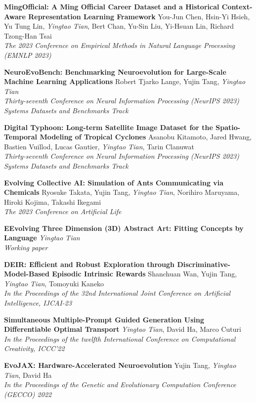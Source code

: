 \documentclass[line,margin]{cv}
\begin{document}
\begin{resume}
  {\bf MingOfficial: A Ming Official Career Dataset and a Historical Context-Aware Representation Learning Framework}
  You-Jun Chen, Hsin-Yi Hsieh, Yu Tung Lin, \emph{Yingtao Tian}, Bert Chan, Yu-Sin Liu, Yi-Hsuan Lin, Richard Tzong-Han Tsai\\
  \emph{The 2023 Conference on Empirical Methods in Natural Language Processing (EMNLP 2023)}

  {\bf NeuroEvoBench: Benchmarking Neuroevolution for Large-Scale Machine Learning Applications}
  Robert Tjarko Lange, Yujin Tang, \emph{Yingtao Tian}\\
  \emph{Thirty-seventh Conference on Neural Information Processing (NeurIPS 2023) Systems Datasets and Benchmarks Track}

  {\bf Digital Typhoon: Long-term Satellite Image Dataset for the Spatio-Temporal Modeling of Tropical Cyclones}
  Asanobu Kitamoto, Jared Hwang, Bastien Vuillod, Lucas Gautier, \emph{Yingtao Tian}, Tarin Clanuwat\\
  \emph{Thirty-seventh Conference on Neural Information Processing (NeurIPS 2023) Systems Datasets and Benchmarks Track}

  {\bf Evolving Collective AI: Simulation of Ants Communicating via Chemicals}
  Ryosuke Takata, Yujin Tang, \emph{Yingtao Tian}, Norihiro Maruyama, Hiroki Kojima, Takashi Ikegami\\
  \emph{The 2023 Conference on Artificial Life}

  {\bf EEvolving Three Dimension (3D) Abstract Art: Fitting Concepts by Language}
  \emph{Yingtao Tian}\\
  \emph{Working paper}

  {\bf DEIR: Efficient and Robust Exploration through Discriminative-Model-Based Episodic Intrinsic Rewards}
  Shanchuan Wan, Yujin Tang, \emph{Yingtao Tian}, Tomoyuki Kaneko\\
  \emph{In the Proceedings of the 32nd International Joint Conference on Artificial Intelligence, IJCAI-23}

  {\bf Simultaneous Multiple-Prompt Guided Generation Using Differentiable Optimal Transport}
  \emph{Yingtao Tian}, David Ha, Marco Cuturi\\
  \emph{In the Proceedings of the twelfth International Conference on Computational Creativity, ICCC'22}

  {\bf EvoJAX: Hardware-Accelerated Neuroevolution}
  Yujin Tang, \emph{Yingtao Tian}, David Ha\\
  \emph{In the Proceedings of the Genetic and Evolutionary Computation Conference (GECCO) 2022}


\end{resume}
\end{document}
